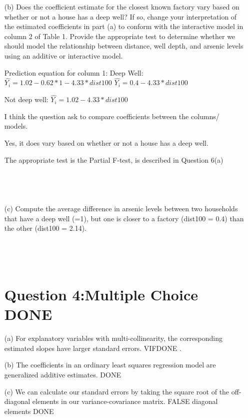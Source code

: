 \documentclass[12pt,letterpaper]{article}
\begin{document}
\begin{enumerate}
\begin{verbatim}
		\end{verbatim}
		\item [(b)] Does the coefficient estimate for the closest known factory vary based on whether or not
		a house has a deep well? If so, change your interpretation of the estimated coefficients
		in part (a) to conform with the interactive model in column 2 of Table 1. Provide
		the appropriate test to determine whether we should model the relationship between
		distance, well depth, and arsenic levels using an additive or interactive model.

			Prediction equation for column 1: 
		Deep Well: $\hat{Y_i}= 1.02-0.62*1 -4.33*dist100$
		$\hat{Y_i}= 0.4 -4.33*dist100$
		
		Not deep well: $\hat{Y_i}= 1.02 -4.33*dist100$
		
		I think the question ask to compare coefficients between the columns/ models. 
		
		Yes, it does vary based on whether or not a house has a deep well. 
		
		The appropriate test is the Partial F-test, is described in Question 6(a)
		
		
		\begin{verbatim}
			
			
			
		\end{verbatim}
	\item [(c)] Compute the average difference in arsenic levels between two households that have a
	deep well (=1), but one is closer to a factory (dist100 = 0.4) than the other (dist100 =
	2.14).
	
	\begin{verbatim}
		
		
		
	\end{verbatim}
\newpage
\section*{Question 4:Multiple Choice DONE}
\item [(a)] For explanatory variables with multi-collinearity, the corresponding estimated slopes have
larger standard errors.
VIFDONE .

\item [(b)] The coefficients in an ordinary least squares regression model are generalized additive estimates.
DONE 

\item [(c)] We can calculate our standard errors by taking the square root of the off-diagonal elements
in our variance-covariance matrix.
FALSE
 diagonal elements DONE


\end{enumerate}
\end{document}
